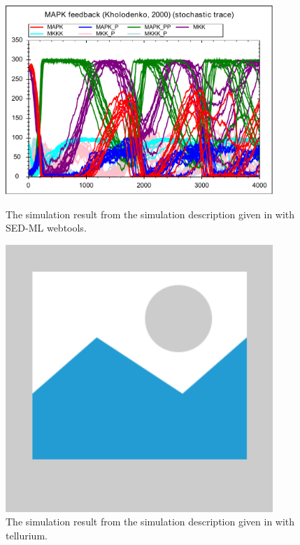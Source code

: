 \begin{figure}[ht]
    \centering
    \begin{minipage}{0.45\textwidth}
        \centering
        \includegraphics[width=0.9\textwidth]{examples/repeated-stochastic-runs/results/repeated-stochastic-runs}
        \caption{The simulation result from the simulation description given in  with SED-ML webtools.}
    \end{minipage}\hfill
    \begin{minipage}{0.45\textwidth}
        \centering
        \includegraphics[width=0.9\textwidth]{examples/placeholder}
        \caption{The simulation result from the simulation description given in  with tellurium.}
    \end{minipage}
    \label{fig:repeated-stochastic-runs}
\end{figure}

